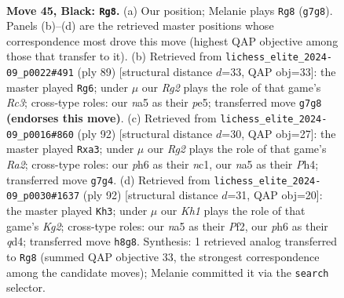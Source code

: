 \documentclass[11pt]{article}
\begin{document}
\clearpage

\begin{figure}[p]\centering
\begin{subfigure}{0.46\textwidth}\centering
\resizebox{\linewidth}{!}{%
\newchessgame
\chessboard[
  setfen={7k/6rp/7P/Np6/6P1/8/PP3Q1K/3R4 b - - 0 45},
  showmover=false,
  pgfstyle=straightmove, color=movearrow, markmove={g7-g8}
]}
\caption{}
\end{subfigure}\hfill
\begin{subfigure}{0.46\textwidth}\centering
\resizebox{\linewidth}{!}{%
\newchessgame
\chessboard[
  setfen={8/5pk1/1pr5/1P2PQ2/P7/8/1KP4P/8 b - - 0 45},
  showmover=false,
  pgfstyle=straightmove, color=movearrow, markmove={c6-g6}
]}
\caption{}
\end{subfigure}
\\[4pt]
\begin{subfigure}{0.46\textwidth}\centering
\resizebox{\linewidth}{!}{%
\newchessgame
\chessboard[
  setfen={8/7p/6p1/8/1k4KP/p3P3/R5P1/2n5 w - - 2 47},
  showmover=false,
  pgfstyle=straightmove, color=movearrow, markmove={a2-a3}
]}
\caption{}
\end{subfigure}\hfill
\begin{subfigure}{0.46\textwidth}\centering
\resizebox{\linewidth}{!}{%
\newchessgame
\chessboard[
  setfen={8/pp6/5k2/8/1P1q3p/P3R3/5PK1/8 w - - 0 47},
  showmover=false,
  pgfstyle=straightmove, color=movearrow, markmove={g2-h3}
]}
\caption{}
\end{subfigure}
\caption{\textbf{Move 45, Black: \texttt{Rg8}.} (a) Our position; Melanie plays \texttt{Rg8} (\texttt{g7g8}). Panels (b)--(d) are the retrieved master positions whose correspondence most drove this move (highest QAP objective among those that transfer to it). (b) Retrieved from \texttt{lichess\_elite\_2024-09\_p0022\#491} (ply 89) [structural distance $d$=33, QAP obj=33]: the master played \texttt{Rg6}; under $\mu$ our \emph{Rg2} plays the role of that game's \emph{Rc3}; cross-type roles: our \emph{n}a5 as their \emph{p}e5; transferred move \texttt{g7g8} \textbf{(endorses this move)}. (c) Retrieved from \texttt{lichess\_elite\_2024-09\_p0016\#860} (ply 92) [structural distance $d$=30, QAP obj=27]: the master played \texttt{Rxa3}; under $\mu$ our \emph{Rg2} plays the role of that game's \emph{Ra2}; cross-type roles: our \emph{p}h6 as their \emph{n}c1, our \emph{n}a5 as their \emph{P}h4; transferred move \texttt{g7g4}. (d) Retrieved from \texttt{lichess\_elite\_2024-09\_p0030\#1637} (ply 92) [structural distance $d$=31, QAP obj=20]: the master played \texttt{Kh3}; under $\mu$ our \emph{Kh1} plays the role of that game's \emph{Kg2}; cross-type roles: our \emph{n}a5 as their \emph{P}f2, our \emph{p}h6 as their \emph{q}d4; transferred move \texttt{h8g8}. Synthesis: 1 retrieved analog transferred to \texttt{Rg8} (summed QAP objective 33, the strongest correspondence among the candidate moves); Melanie committed it via the \texttt{search} selector.}
\label{fig:thought-m89}
\end{figure}
\end{document}
